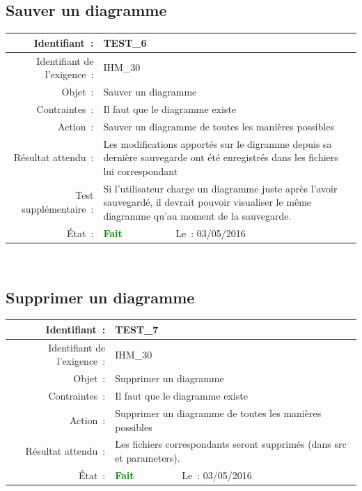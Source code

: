 \documentclass[hidelinks, a4paper,11pt,twoside,final]{article}
\begin{document}
    \subsection*{Sauver un diagramme}
    \begin{tabular}{|r|p{5cm}|p{5cm}|}\hline
    {Identifiant~:} & \multicolumn{2}{|p{10cm}|}{TEST\_6} \\\hline
    {Identifiant de l’exigence~:} & \multicolumn{2}{|p{10cm}|}{IHM\_30} \\\hline
        {Objet~:} & \multicolumn{2}{|p{10cm}|}{Sauver un diagramme} \\\hline
        {Contraintes~:} & \multicolumn{2}{|p{10cm}|}{Il faut que le diagramme existe} \\\hline
        {Action~:} & \multicolumn{2}{|p{10cm}|}{Sauver un diagramme de toutes les manières possibles} \\\hline
        {Résultat attendu~:} & \multicolumn{2}{|p{10cm}|}{Les modifications apportés sur le digramme depuis sa dernière sauvegarde ont été enregistrés
        dans les fichiers lui correspondant} \\\hline
    {Test supplémentaire~:} & \multicolumn{2}{|p{10cm}|}{Si l’utilisateur charge un diagramme juste après l’avoir sauvegardé, il devrait
                                pouvoir visualiser le même diagramme qu’au moment de la sauvegarde.} \\\hline
        {État~:} & {\textcolor{green}{\textbf{Fait}}} & {Le~: 03/05/2016 } \\\hline
    \end{tabular}
    \\
    \newline

    \subsection*{Supprimer un diagramme}
    \begin{tabular}{|r|p{5cm}|p{5cm}|}\hline
    {Identifiant~:} & \multicolumn{2}{|p{10cm}|}{TEST\_7} \\\hline
    {Identifiant de l’exigence~:} & \multicolumn{2}{|p{10cm}|}{IHM\_30} \\\hline
        {Objet~:} & \multicolumn{2}{|p{10cm}|}{Supprimer un diagramme} \\\hline
        {Contraintes~:} & \multicolumn{2}{|p{10cm}|}{Il faut que le diagramme existe} \\\hline
        {Action~:} & \multicolumn{2}{|p{10cm}|}{Supprimer un diagramme de toutes les manières possibles} \\\hline
        {Résultat attendu~:} & \multicolumn{2}{|p{10cm}|}{Les fichiers correspondants seront supprimés (dans src et parameters).} \\\hline
        {État~:} & {\textcolor{green}{\textbf{Fait}}} & {Le~: 03/05/2016 } \\\hline
    \end{tabular}
    \\
    \newline
\end{document}

